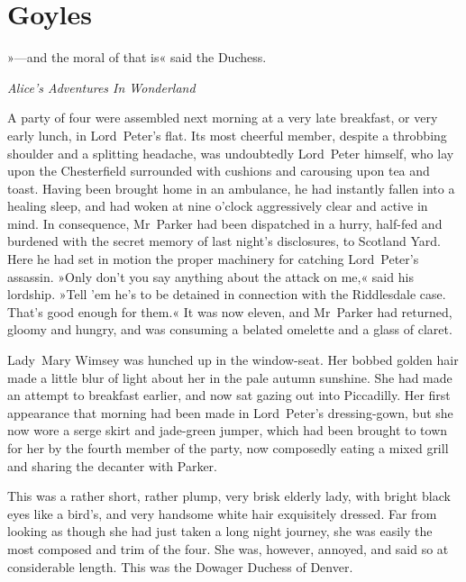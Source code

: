 

\chapter{Goyles}

\epigraph{»—and the moral of that is\longdash« said the Duchess.}{\textit{Alice's Adventures In Wonderland}}


\lettrine[lines=4]{A}{} party of four were assembled next morning at a very late breakfast, or very early lunch, in Lord~Peter's flat. Its most cheerful member, despite a throbbing shoulder and a splitting headache, was undoubtedly Lord~Peter himself, who lay upon the Chesterfield surrounded with cushions and carousing upon tea and toast. Having been brought home in an ambulance, he had instantly fallen into a healing sleep, and had woken at nine o'clock aggressively clear and active in mind. In consequence, Mr~Parker had been dispatched in a hurry, half-fed and burdened with the secret memory of last night's disclosures, to Scotland Yard. Here he had set in motion the proper machinery for catching Lord~Peter's assassin. »Only don't you say anything about the attack on me,« said his lordship. »Tell 'em he's to be detained in connection with the Riddlesdale case. That's good enough for them.« It was now eleven, and Mr~Parker had returned, gloomy and hungry, and was consuming a belated omelette and a glass of claret.

Lady~Mary Wimsey was hunched up in the window-seat. Her bobbed golden hair made a little blur of light about her in the pale autumn sunshine.  She had made an attempt to breakfast earlier, and now sat gazing out into Piccadilly. Her first appearance that morning had been made in Lord~Peter's dressing-gown, but she now wore a serge skirt and jade-green jumper, which had been brought to town for her by the fourth member of the party, now composedly eating a mixed grill and sharing the decanter with Parker.

This was a rather short, rather plump, very brisk elderly lady, with bright black eyes like a bird's, and very handsome white hair exquisitely dressed. Far from looking as though she had just taken a long night journey, she was easily the most composed and trim of the four. She was, however, annoyed, and said so at considerable length.  This was the Dowager Duchess of Denver.

